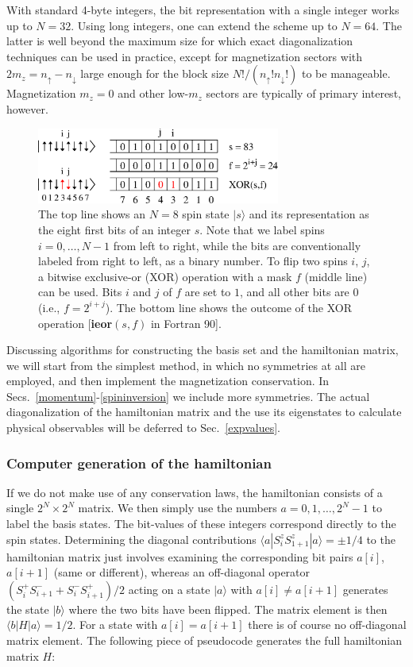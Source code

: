 \documentclass[draft,numberedheadings]{aipproc}
\newcommand{\dn}{\downarrow}
\newcommand{\up}{\uparrow}
\begin{document}
With standard 4-byte integers, the bit representation with a single integer works up to $N=32$. Using long integers, one can extend the scheme up to 
$N=64$. The latter is well beyond the maximum size for which exact diagonalization techniques can be used in practice, except for magnetization sectors 
with $2m_z=n_\up-n_\dn$ large enough for the block size $N!/(n_{\up}!n_{\dn}!)$ to be manageable. Magnetization $m_z=0$ and other low-$m_z$ sectors are 
typically of primary interest, however.

\begin{figure}
\includegraphics[width=8cm, clip]{bitstates1.eps}
\caption{The top line shows an $N=8$ spin state $|s\rangle$ and its representation as the eight first bits of an integer $s$. Note that we label spins
$i=0,\ldots,N-1$ from left to right, while the bits are conventionally labeled from right to left, as a binary number. To flip two spins $i$, $j$, 
a bitwise exclusive-or (XOR) operation with a mask $f$ (middle line) can be used. Bits $i$ and $j$ of $f$ are set to $1$, and all other bits are $0$
(i.e., $f=2^{i+j}$). The bottom line shows the outcome of the XOR operation [{\bf ieor}$(s,f)$ in Fortran 90].}
\label{bitstates1}
\end{figure}

Discussing algorithms for constructing the basis set and the hamiltonian matrix, we will start from the simplest method, in which no symmetries at all 
are employed, and then implement the magnetization conservation. In Secs.~\ref{momentum}-\ref{spininversion} we include more symmetries. The actual 
diagonalization of the hamiltonian matrix and the use its eigenstates to calculate physical observables will be deferred to Sec.~\ref{expvalues}.

\subsubsection{Computer generation of the hamiltonian}
\label{makehamiltonian}

If we do not make use of any conservation laws, the hamiltonian consists of a single $2^N \times 2^N$ matrix. We then simply use the
numbers $a=0,1,\ldots,2^N-1$ to label the basis states. The bit-values of these integers correspond directly to the spin states. Determining the diagonal 
contributions $\langle a|S^z_iS^z_{1+1}|a\rangle=\pm 1/4$ to the hamiltonian matrix just involves examining the corresponding bit pairs
$a[i]$, $a[i+1]$ (same or different), whereas an off-diagonal operator $(S^+_iS^-_{i+1} + S^-_iS^+_{i+1})/2$ acting on a state $|a\rangle$ with $a[i] \not= a[i+1]$ 
generates the state $|b\rangle$ where the two bits have been flipped. The matrix element is then $\langle b|H|a\rangle = 1/2$. For a state with $a[i] = a[i+1]$ 
there is of course no off-diagonal matrix element. The following piece of pseudocode generates the full hamiltonian matrix $H$:
\end{document}
